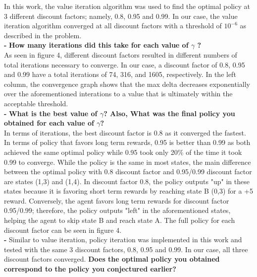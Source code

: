 \documentclass[11pt]{article}
\begin{document}
\noindent
In this work, the value iteration algorithm was used to find the optimal policy
at 3 different discount factors; namely, 0.8, 0.95 and 0.99. In our case, the
value iteration algorithm converged at all discount factors with a threshold of
$10^{-6}$ as described in the problem.\\


\noindent
\textbf{-}
\noindent
\textbf{How many iterations did this take for each value of $\gamma$ ?}
\\

\noindent
As seen in figure 4, different discount factors resulted in different numbers of
total iterations necessary to converge. In our case, a discount factor of 0.8,
0.95 and 0.99 have a total iterations of 74, 316, and 1605, respectively. In the
left column, the convergence graph shows that the max delta decreases
exponentially over the aforementioned interations to a value that is ultimately
within the acceptable threshold.
\\

\noindent
\textbf{-}
\noindent
\textbf{What is the best value of $\gamma$? Also, What was the final policy you
obtained for each value of $\gamma$?}
\\

\noindent
In terms of iterations, the best discount factor is 0.8 as it converged the
fastest. In terms of policy that favors long term rewards, 0.95 is better than
0.99 as both achieved the same optimal policy while 0.95 took only 20\% of the
time it took 0.99 to converge. While the policy is the same in most states, the
main difference between the optimal policy with 0.8 discount factor and
0.95/0.99 discount factor are states (1,3) and (1,4). In discount factor 0.8,
the policy outputs "up" in these states because it is favoring short term
rewards by reaching state B (0,3) for a +5 reward. Conversely, the agent favors
long term rewards for discount factor 0.95/0.99; therefore, the policy outputs
"left" in the aforementioned states, helping the agent to skip state B and reach
state A. The full policy for each discount factor can be seen in figure 4.
\\

\noindent
\textbf{-}
Similar to value iteration, policy iteration was implemented in this work and
tested with the same 3 discount factors, 0.8, 0.95 and 0.99. In our case, all
three discount factors converged.
\noindent
\textbf{Does the optimal policy you obtained correspond to the policy you
conjectured earlier?}
\\
\end{document}
